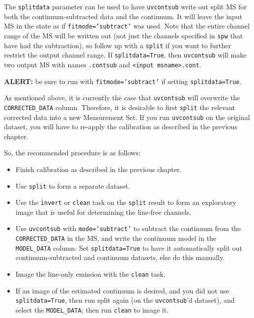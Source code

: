 The {\tt splitdata} parameter can be used to have {\tt uvcontsub}
write out split MS for both the continuum-subtracted data and the
continuum.  It will leave the input MS in the state as if 
{\tt fitmode='subtract'} was used.  Note that the entire channel
range of the MS will be written out (not just the channels specified
in {\tt spw} that have had the subtraction), so follow up with
a {\tt split} if you want to further restrict the output channel range.
If {\tt splitdata=True}, then {\tt uvcontsub} will make two output
MS with names {\tt <input msname>.contsub} and {\tt <input
  msname>.cont}.


{\bf ALERT:} be sure to
run with {\tt fitmode='subtract'} if setting {\tt splitdata=True}.

As mentioned above, it is currently the case that {\tt uvcontsub} will
overwrite the {\tt CORRECTED\_DATA} column. Therefore, it is desirable
to first {\tt split} the relevant corrected data into a new Measurement Set.  
If you run {\tt uvcontsub} on the original dataset, you will
have to re-apply the calibration as described in the previous chapter.

So, the recommended procedure is as follows: 
\begin{itemize}
   \item Finish calibration as described in the previous chapter.
   \item Use {\tt split} to form a separate dataset.
   \item Use the {\tt invert} or {\tt clean} task on the {\tt split}
         result to form an exploratory image that is useful for
         determining the line-free channels.
   \item Use {\tt uvcontsub} with {\tt mode='subtract'} to subtract
         the continuum from the {\tt CORRECTED\_DATA} in the MS,
         and write the continuum model in the {\tt MODEL\_DATA} column.
         Set {\tt splitdata=True} to have it automatically split out
         continuum-subtracted and continuum datasets, else do this 
         manually.         
   \item Image the line-only emission with the {\tt clean} task.
   \item If an image of the estimated continuum is desired, and
         you did not use {\tt splitdata=True}, then run split
         again (on the {\tt uvcontsub}'d dataset), and select the 
         {\tt MODEL\_DATA}; then run {\tt clean} to image it.
\end{itemize}


